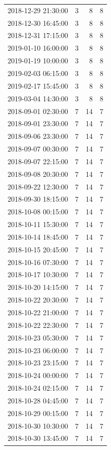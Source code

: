 \begin{tabular}{lrrr}
2018-12-29 21:30:00 & 3 & 8 & 8 \\
2018-12-30 16:45:00 & 3 & 8 & 8 \\
2018-12-31 17:15:00 & 3 & 8 & 8 \\
2019-01-10 16:00:00 & 3 & 8 & 8 \\
2019-01-19 10:00:00 & 3 & 8 & 8 \\
2019-02-03 06:15:00 & 3 & 8 & 8 \\
2019-02-17 15:45:00 & 3 & 8 & 8 \\
2019-03-04 14:30:00 & 3 & 8 & 8 \\
2018-09-01 02:30:00 & 7 & 14 & 7 \\
2018-09-01 23:30:00 & 7 & 14 & 7 \\
2018-09-06 23:30:00 & 7 & 14 & 7 \\
2018-09-07 00:30:00 & 7 & 14 & 7 \\
2018-09-07 22:15:00 & 7 & 14 & 7 \\
2018-09-08 20:30:00 & 7 & 14 & 7 \\
2018-09-22 12:30:00 & 7 & 14 & 7 \\
2018-09-30 18:15:00 & 7 & 14 & 7 \\
2018-10-08 00:15:00 & 7 & 14 & 7 \\
2018-10-11 15:30:00 & 7 & 14 & 7 \\
2018-10-14 18:45:00 & 7 & 14 & 7 \\
2018-10-15 20:45:00 & 7 & 14 & 7 \\
2018-10-16 07:30:00 & 7 & 14 & 7 \\
2018-10-17 10:30:00 & 7 & 14 & 7 \\
2018-10-20 14:15:00 & 7 & 14 & 7 \\
2018-10-22 20:30:00 & 7 & 14 & 7 \\
2018-10-22 21:00:00 & 7 & 14 & 7 \\
2018-10-22 22:30:00 & 7 & 14 & 7 \\
2018-10-23 05:30:00 & 7 & 14 & 7 \\
2018-10-23 06:00:00 & 7 & 14 & 7 \\
2018-10-23 23:15:00 & 7 & 14 & 7 \\
2018-10-24 00:00:00 & 7 & 14 & 7 \\
2018-10-24 02:15:00 & 7 & 14 & 7 \\
2018-10-28 04:45:00 & 7 & 14 & 7 \\
2018-10-29 00:15:00 & 7 & 14 & 7 \\
2018-10-30 10:30:00 & 7 & 14 & 7 \\
2018-10-30 13:45:00 & 7 & 14 & 7 \\

\end{tabular}
